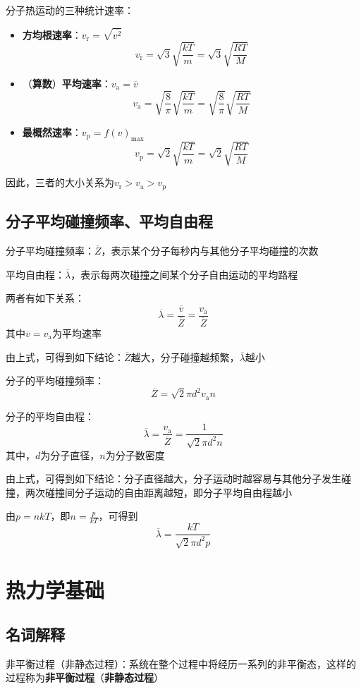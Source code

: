 \documentclass[12pt, a4paper, twoside]{ctexbook}
\begin{document}
{\sonti 分子热运动的三种统计速率}：
\begin{itemize}
    \item \textbf{方均根速率}：$v_\mathrm{r}=\sqrt{\overline{v^2}}$
    $$
    v_\mathrm{r}=\sqrt{3}\sqrt{\frac{kT}{m}}=\sqrt{3}\sqrt{\frac{RT}{M}}
    $$
    \item {\sonti （}\textbf{算数}{\sonti ）}\textbf{平均速率}：$v_\mathrm{a}=\overline{v}$
    $$
    v_\mathrm{a}=\sqrt{\frac{8}{\pi}}\sqrt{\frac{kT}{m}}=\sqrt{\frac{8}{\pi}}\sqrt{\frac{RT}{M}}
    $$
    \item \textbf{最概然速率}：$v_\mathrm{p}=f\left(v\right)_\mathrm{max}$
    $$
    v_\mathrm{p}=\sqrt{2}\sqrt{\frac{kT}{m}}=\sqrt{2}\sqrt{\frac{RT}{M}}
    $$
\end{itemize}

因此，三者的大小关系为$v_\mathrm{r}>v_\mathrm{a}>v_\mathrm{p}$
\section{分子平均碰撞频率、平均自由程}
{\sonti 分子平均碰撞频率}：$\overline{Z}$，表示某个分子每秒内与其他分子平均碰撞的次数

{\sonti 平均自由程}：$\overline{\lambda}$，表示每两次碰撞之间某个分子自由运动的平均路程

两者有如下关系：
$$
\overline{\lambda}=\frac{\overline{v}}{\overline{Z}}=\frac{v_\mathrm{a}}{\overline{Z}}
$$
其中$\overline{v}=v_\mathrm{a}$为平均速率

由上式，可得到如下结论：$\overline{Z}$越大，分子碰撞越频繁，$\overline{\lambda}$越小

{\sonti 分子的平均碰撞频率}：
$$
\overline{Z}=\sqrt{2}\pi d^2 v_\mathrm{a} n
$$

{\sonti 分子的平均自由程}：
$$
\overline{\lambda}=\frac{v_\mathrm{a}}{\overline{Z}}=\frac{1}{\sqrt{2}\pi d^2 n}
$$
其中，$d$为分子直径，$n$为分子数密度

由上式，可得到如下结论：分子直径越大，分子运动时越容易与其他分子发生碰撞，两次碰撞间分子运动的自由距离越短，即分子平均自由程越小

由$p=nkT$，即$n=\frac{p}{kT}$，可得到
$$
\overline{\lambda}=\frac{kT}{\sqrt{2}\pi d^2 p}
$$
\chapter{热力学基础}
\newpage
\section{名词解释}
{\sonti 非平衡过程（非静态过程）}：系统在整个过程中将经历一系列的非平衡态，这样的过程称为\textbf{非平衡过程}{\sonti （}\textbf{非静态过程}{\sonti ）}
\end{document}
